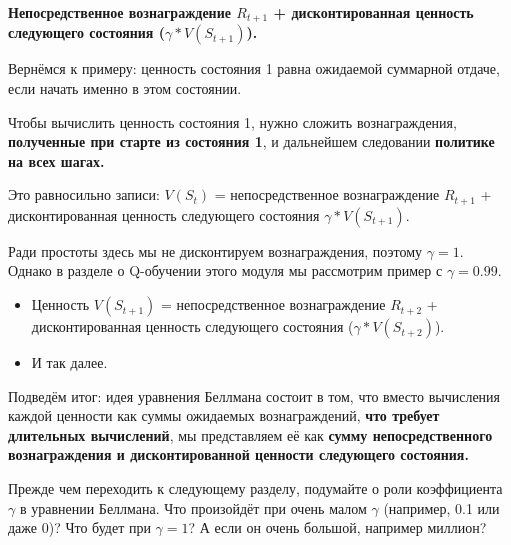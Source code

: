 \documentclass[11pt,a4paper]{article}
\begin{document}
\textbf{Непосредственное вознаграждение \(R_{t+1}\) + дисконтированная ценность следующего состояния (\(\gamma * V(S_{t+1})\)).}


Вернёмся к примеру: ценность состояния 1 равна ожидаемой суммарной отдаче, если начать именно в этом состоянии.


Чтобы вычислить ценность состояния 1, нужно сложить вознаграждения, \textbf{полученные при старте из состояния 1}, и дальнейшем следовании \textbf{политике на всех шагах.}

Это равносильно записи: \(V(S_{t})\) = непосредственное вознаграждение \(R_{t+1}\) + дисконтированная ценность следующего состояния \(\gamma * V(S_{t+1})\).


Ради простоты здесь мы не дисконтируем вознаграждения, поэтому \(\gamma = 1\). Однако в разделе о Q-обучении этого модуля мы рассмотрим пример с \(\gamma = 0.99\).

\begin{itemize}
\tightlist
\item
  Ценность \(V(S_{t+1})\) = непосредственное вознаграждение \(R_{t+2}\) + дисконтированная ценность следующего состояния (\(\gamma * V(S_{t+2})\)).
\item
  И так далее.
\end{itemize}

Подведём итог: идея уравнения Беллмана состоит в том, что вместо вычисления каждой ценности как суммы ожидаемых вознаграждений, \textbf{что требует длительных вычислений}, мы представляем её как \textbf{сумму непосредственного вознаграждения и дисконтированной ценности следующего состояния.}

Прежде чем переходить к следующему разделу, подумайте о роли коэффициента \(\gamma\) в уравнении Беллмана. Что произойдёт при очень малом \(\gamma\) (например, 0.1 или даже 0)? Что будет при \(\gamma=1\)? А если он очень большой, например миллион?
\end{document}
